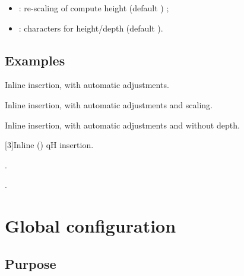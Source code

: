 \documentclass[11pt,a4paper]{ltxdoc}
\begin{document}
\begin{itemize}
  \item {}: re-scaling of compute height (default ) ;
  \item {}: characters for height/depth (default ).
\end{itemize}

\subsection{Examples}

\begin{DemoCode}{}
Inline insertion,  with automatic adjustments.

Inline insertion,  with automatic adjustments and scaling.

Inline insertion,  with automatic adjustments and without depth.
\end{DemoCode}

\begin{DemoCode}{}
\scalebox{3}[3]{Inline () qH insertion}.
\end{DemoCode}

\begin{DemoCode}{}
.
\end{DemoCode}

\begin{DemoCode}{}
.
\end{DemoCode}

\begin{DemoCode}{}
\end{DemoCode}

\pagebreak

\section{Global configuration}

\subsection{Purpose}
\end{document}
